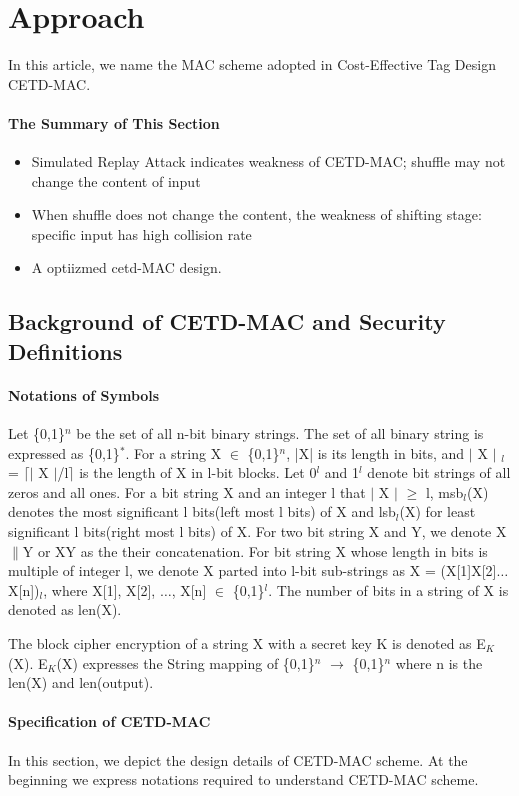 \documentclass{article}
\begin{document}
\section{Approach}
In this article, we name the MAC scheme adopted in Cost-Effective Tag Design\cite{} CETD-MAC. 
\paragraph{The Summary of This Section}
\begin{itemize}
	\item Simulated Replay Attack indicates weakness of CETD-MAC; shuffle may not change the content of input
	\item When shuffle does not change the content, the weakness of shifting stage: specific input has high collision rate
	\item A optiizmed cetd-MAC design.
\end{itemize}
\subsection{Background of CETD-MAC and Security Definitions}
\paragraph{Notations of Symbols}
Let \{0,1\}$^n$ be the set of all n-bit binary strings. The set of all binary string is expressed as \{0,1\}$^*$.  
For a string X $\in$ \{0,1\}$^n$, |X| is its length in bits, and $\vert$ X $\vert$ $_l$ = $\lceil$$\vert$ X $\vert$/l$\rceil$ is the length of X in l-bit blocks.  Let 0$^l$ and 1$^l$ denote bit strings of all zeros and all ones. 
For a bit string X and an integer l that $\vert$ X $\vert$ $\geq$ l, msb$_l$(X) denotes the most significant l bits(left most l bits) of X and lsb$_l$(X) for least significant l bits(right most l bits) of X.
For two bit string X and Y, we denote X$\|$Y  or XY as the their concatenation. For bit string X whose length in bits is multiple of integer l, we denote X parted into l-bit sub-strings as X = (X[1]X[2]$\ldots$X[n])$_l$, where X[1], X[2], $\ldots$, X[n] $\in$ \{0,1\}$^l$.
The number of bits in a string of X is denoted as len(X).

The block cipher encryption of a string X with a secret key K is denoted as E$_K$(X). E$_K$(X) expresses the String mapping of \{0,1\}$^n$ $\rightarrow$ \{0,1\}$^n$ where n is the len(X) and len(output).

\paragraph{Specification of CETD-MAC}
In this section, we depict the design details of CETD-MAC scheme. At the beginning we express notations required to understand CETD-MAC scheme. 
\end{document}
